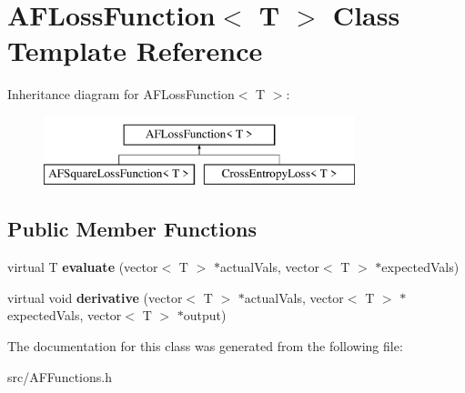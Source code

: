 \hypertarget{classAFLossFunction}{}\section{A\+F\+Loss\+Function$<$ T $>$ Class Template Reference}
\label{classAFLossFunction}
Inheritance diagram for A\+F\+Loss\+Function$<$ T $>$\+:\begin{figure}[H]
\begin{center}
\leavevmode
\includegraphics[height=2.000000cm]{classAFLossFunction}
\end{center}
\end{figure}
\subsection*{Public Member Functions}
\begin{DoxyCompactItemize}
\item 
\mbox{\label{classAFLossFunction_a6c3fc3ca180b26d39275ab800b6447de}} 
virtual T {\bfseries evaluate} (vector$<$ T $>$ $\ast$actual\+Vals, vector$<$ T $>$ $\ast$expected\+Vals)
\item 
\mbox{\label{classAFLossFunction_ac04d8512f05f77d836700e02c81f3854}} 
virtual void {\bfseries derivative} (vector$<$ T $>$ $\ast$actual\+Vals, vector$<$ T $>$ $\ast$expected\+Vals, vector$<$ T $>$ $\ast$output)
\end{DoxyCompactItemize}


The documentation for this class was generated from the following file\+:\begin{DoxyCompactItemize}
\item 
src/A\+F\+Functions.\+h\end{DoxyCompactItemize}
